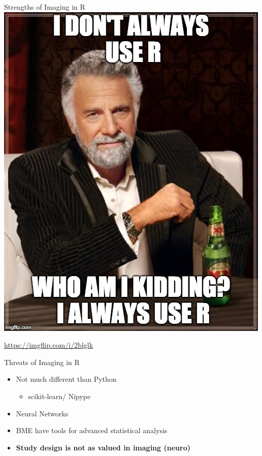 \documentclass[ignorenonframetext,]{beamer}
\providecommand{\tightlist}{%
  \setlength{\itemsep}{0pt}\setlength{\parskip}{0pt}}
\begin{document}
\begin{frame}[fragile]
\begin{block}{Strengths of Imaging in R}
\hypertarget{right_col}{}
\includegraphics[width=1\linewidth]{figure/always_use_r}

\url{https://imgflip.com/i/2blglk}

\end{block}

\begin{block}{Threats of Imaging in R}

\begin{itemize}
\tightlist
\item
  Not much different than Python

  \begin{itemize}
  \tightlist
  \item
    scikit-learn/ Nipype
  \end{itemize}
\item
  Neural Networks
\item
  BME have tools for advanced statistical analysis
\item
  \textbf{Study design is not as valued in imaging (neuro)}


\end{itemize}
\end{block}
\end{frame}
\end{document}
